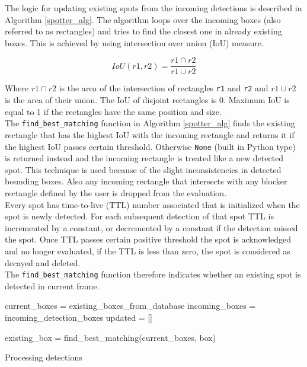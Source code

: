 \documentclass[thesis=M,english]{FITthesis}[2019/03/06]
\begin{document}
The logic for updating existing spots from the incoming detections is described in Algorithm \ref{spotter_alg}. The algorithm loops over the incoming boxes (also referred to as rectangles) and tries to find the closest one in already existing boxes. This is achieved by using intersection over union (IoU) measure. 

$$
IoU(r1, r2) = \frac{r1 \cap r2}{r1 \cup r2} 
$$

Where $r1 \cap r2$ is the area of the intersection of rectangles \texttt{r1} and \texttt{r2} and $r1  \cup  r2$ is the area of their union. The IoU of disjoint rectangles is 0. Maximum IoU is equal to 1 if the rectangles have the same position and size.\\

The \texttt{find_best_matching} function in Algorithm \ref{spotter_alg} finds the existing rectangle that has the highest IoU with the incoming rectangle and returns it if the highest IoU passes certain threshold. Otherwise \texttt{None} (built in Python type) is returned instead and the incoming rectangle is treated like a new detected spot. This technique is used because of the slight inconsistencies in detected bounding boxes. Also any incoming rectangle that intersects with any blocker rectangle defined by the user is dropped from the evaluation. \\


Every spot has time-to-live (TTL) number associated that is initialized when the spot is newly detected. For each subsequent detection of that spot TTL is incremented by a constant, or decremented by a constant if the detection missed the spot. Once TTL passes certain positive threshold the spot is acknowledged and no longer evaluated, if the TTL is less than zero, the spot is considered as decayed and deleted.\\

The \texttt{find_best_matching} function therefore indicates whether an existing spot is detected in current frame. 




\begin{algorithm}[ht!]
\SetAlgoLined
current_boxes = existing_boxes_from_database\;  
incoming_boxes = incoming_detection_boxes\;
updated = []\;
 
  {
    existing_box = find_best_matching(current_boxes, box)
    
 }
 
 
 \label{spotter_alg}
 \caption{Processing detections}
\end{algorithm}
\end{document}
